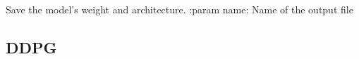 \documentclass[letterpaper,10pt,english]{sphinxmanual}
\begin{document}
\begin{fulllineitems}
\begin{fulllineitems}
\end{fulllineitems}


\begin{fulllineitems}
\label{\detokenize{package2:dqn.DQNAgent.saveModel}}
Save the model's weight and architecture.
:param name: Name of the output file

\end{fulllineitems}


\end{fulllineitems}



\subsection{DDPG}
\label{\detokenize{package2:ddpg}}\label{\detokenize{package2:module-DDPG}}
\end{document}
